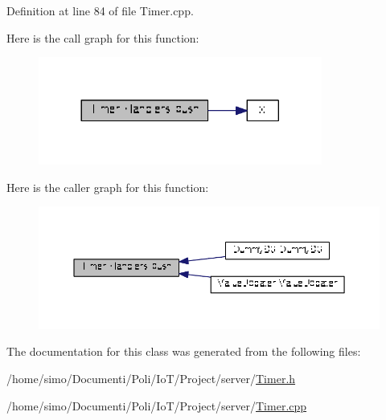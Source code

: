 Definition at line 84 of file Timer.\+cpp.



Here is the call graph for this function\+:\nopagebreak
\begin{figure}[H]
\begin{center}
\leavevmode
\includegraphics[width=264pt]{class_timer_1_1_handlers_a62acbf73c85217fdf91b557d85143ec0_cgraph}
\end{center}
\end{figure}




Here is the caller graph for this function\+:\nopagebreak
\begin{figure}[H]
\begin{center}
\leavevmode
\includegraphics[width=350pt]{class_timer_1_1_handlers_a62acbf73c85217fdf91b557d85143ec0_icgraph}
\end{center}
\end{figure}




The documentation for this class was generated from the following files\+:\begin{DoxyCompactItemize}
\item 
/home/simo/\+Documenti/\+Poli/\+Io\+T/\+Project/server/\hyperlink{_timer_8h}{Timer.\+h}\item 
/home/simo/\+Documenti/\+Poli/\+Io\+T/\+Project/server/\hyperlink{_timer_8cpp}{Timer.\+cpp}\end{DoxyCompactItemize}
